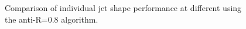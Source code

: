 \begin{figure}
\begin{center}
\caption{Comparison of individual jet shape performance at different \pt using the anti-\kT R=0.8 algorithm.}
\label{fig:ptcomparison_singleshape_top}
\end{center}
\end{figure}


